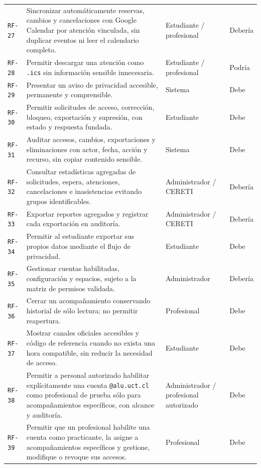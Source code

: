 \documentclass[10pt,a4paper,oneside]{article}
\newcommand{\id}[1]{\texttt{#1}}
\begin{document}
\begin{longtable}{@{}L{0.065\textwidth}L{0.60\textwidth}L{0.15\textwidth}L{0.14\textwidth}@{}}
\id{RF-27} & Sincronizar automáticamente reservas, cambios y cancelaciones con Google Calendar por atención vinculada, sin duplicar eventos ni leer el calendario completo. & Estudiante / profesional & Debería\\
\id{RF-28} & Permitir descargar una atención como \texttt{.ics} sin información sensible innecesaria. & Estudiante / profesional & Podría\\
\id{RF-29} & Presentar un aviso de privacidad accesible, permanente y comprensible. & Sistema & Debe\\
\id{RF-30} & Permitir solicitudes de acceso, corrección, bloqueo, exportación y supresión, con estado y respuesta fundada. & Estudiante & Debe\\
\id{RF-31} & Auditar accesos, cambios, exportaciones y eliminaciones con actor, fecha, acción y recurso, sin copiar contenido sensible. & Sistema & Debe\\
\id{RF-32} & Consultar estadísticas agregadas de solicitudes, espera, atenciones, cancelaciones e inasistencias evitando grupos identificables. & Administrador / CERETI & Debería\\
\id{RF-33} & Exportar reportes agregados y registrar cada exportación en auditoría. & Administrador / CERETI & Debería\\
\id{RF-34} & Permitir al estudiante exportar sus propios datos mediante el flujo de privacidad. & Estudiante & Debe\\
\id{RF-35} & Gestionar cuentas habilitadas, configuración y espacios, sujeto a la matriz de permisos validada. & Administrador & Debería\\
\id{RF-36} & Cerrar un acompañamiento conservando historial de sólo lectura; no permitir reapertura. & Profesional & Debe\\
\id{RF-37} & Mostrar canales oficiales accesibles y código de referencia cuando no exista una hora compatible, sin reducir la necesidad de acceso. & Estudiante & Debe\\
\id{RF-38} & Permitir a personal autorizado habilitar explícitamente una cuenta \texttt{@alu.uct.cl} como profesional de prueba sólo para acompañamientos específicos, con alcance y auditoría. & Administrador / profesional autorizado & Debe\\
\id{RF-39} & Permitir que un profesional habilite una cuenta como practicante, la asigne a acompañamientos específicos y gestione, modifique o revoque sus accesos. & Profesional & Debe\\
\end{longtable}
\normalsize
\end{document}
